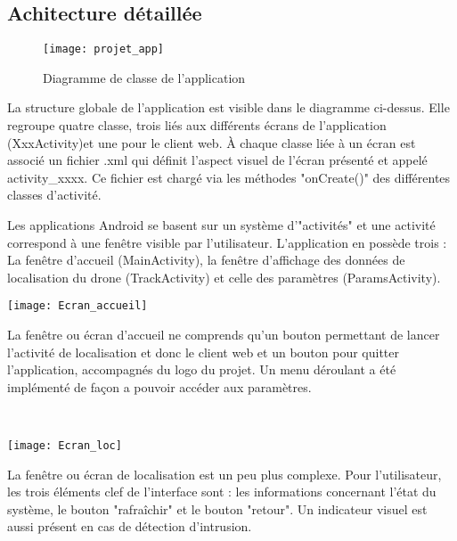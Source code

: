 \subsection{Achitecture détaillée}


\begin{figure}[h]
  \centering
  \texttt{[image: projet\_app]}
  \caption{Diagramme de classe de l'application}
  \label{fig:down}
\end{figure}

	La structure globale de l'application est visible dans le diagramme ci-dessus. Elle regroupe quatre classe, trois liés aux différents écrans de l'application (XxxActivity)et une pour le client web. À chaque classe liée à un écran est associé un fichier .xml qui définit l'aspect visuel de l'écran présenté et appelé activity\_xxxx. Ce fichier est chargé via les méthodes "onCreate()" des différentes classes d'activité.

	Les applications Android se basent sur un système d'"activités" et une activité correspond à une fenêtre visible par l'utilisateur. L'application en possède trois : La fenêtre d'accueil (MainActivity), la fenêtre d'affichage des données de localisation du drone (TrackActivity) et celle des paramètres (ParamsActivity).
	
	\begin{minipage}{0.35\linewidth}
 		\centering
  		\texttt{[image: Ecran\_accueil]}
	\end{minipage}
	\begin{minipage}{0.45\linewidth}

	La fenêtre ou écran d'accueil ne comprends qu'un bouton permettant de lancer l'activité de localisation et donc le client web et un bouton pour quitter l'application, accompagnés du logo du projet. Un menu déroulant a été implémenté de façon a pouvoir accéder aux paramètres.
	\end{minipage}
	~\\	
	
	\begin{minipage}{0.35\linewidth}
 		\centering
 	 \texttt{[image: Ecran\_loc]}
	\end{minipage}
	\begin{minipage}{0.45\linewidth}
	 La fenêtre ou écran de localisation est un peu plus complexe. Pour l'utilisateur, les trois éléments clef de l'interface sont : les informations concernant l'état du système, le bouton "rafraîchir" et le bouton "retour". Un indicateur visuel est aussi présent en cas de détection d'intrusion.
	\end{minipage}
	~\\
	
